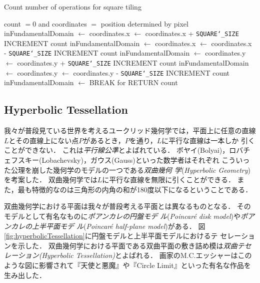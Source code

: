 \begin{algorithm}
 \begin{algorithmic}
  \caption{Count number of operations for square tiling}
  \label{alg:rectTile}
  \REQUIRE count $= 0$ and coordinates $=$ position determined by pixel
  \STATE inFundamentalDomain $\leftarrow$ \TRUE
  \STATE coordinates.x $\leftarrow$ coordinates.x + \texttt{SQUARE\char`_SIZE}
  \STATE INCREMENT count
  \STATE inFundamentalDomain $\leftarrow$ \FALSE
  \ENDIF
  \STATE coordinates.x $\leftarrow$ coordinates.x - \texttt{SQUARE\char`_SIZE}
  \STATE INCREMENT count
  \STATE inFundamentalDomain $\leftarrow$ \FALSE
  \ENDIF
  \STATE coordinates.y $\leftarrow$ coordinates.y + \texttt{SQUARE\char`_SIZE}
  \STATE INCREMENT count
  \STATE inFundamentalDomain $\leftarrow$ \FALSE
  \ENDIF
  \STATE coordinates.y $\leftarrow$ coordinates.y - \texttt{SQUARE\char`_SIZE}
  \STATE INCREMENT count
  \STATE inFundamentalDomain $\leftarrow$ \FALSE
  \ENDIF
  \STATE BREAK for
  \ENDIF
  \ENDFOR
  \STATE RETURN count
 \end{algorithmic}
\end{algorithm}

\subsection{Hyperbolic Tessellation}

我々が普段見ている世界を考えるユークリッド幾何学では，平面上に任意の直線
$L$とその直線上にない点$P$があるとき，$P$を通り，$L$に平行な直線は一本しか
引くことができない．
これは\emph{平行線公準}とよばれている．
ボヤイ(Bolyai)，ロバチェフスキー(Lobachevsky)，ガウス(Gauss)といった数学者はそれぞれ
こういった公理を崩した幾何学のモデルの一つである\emph{双曲幾何
学}(\textit{Hyperbolic Geometry})を考案した．
双曲幾何学では$L$に平行な直線を無限に引くことができる．
また，最も特徴的なのは三角形の内角の和が180度以下になるということである．

双曲幾何学における平面は我々が普段考える平面とは異なるものとなる．
そのモデルとして有名なものに\emph{ポアンカレの円盤モデ
ル}(\textit{Poincar\'e disk model})や\emph{ポアンカレの上半平面モデ
ル}(\textit{Poincar\'e half-plane model})がある．
図\ref{fig:hyperbolicTessellation}に円盤モデルと上半平面モデルにおけるテ
セレーションを示した．
双曲幾何学における平面である双曲平面の敷き詰め模は\emph{双曲テセ
レーション}{\it (Hyperbolic Tessellation)}とよばれる．
画家のM.C.エッシャーはこのような図に影響されて『天使と悪魔』や『Circle
Limit』といった有名な作品を生み出した．


